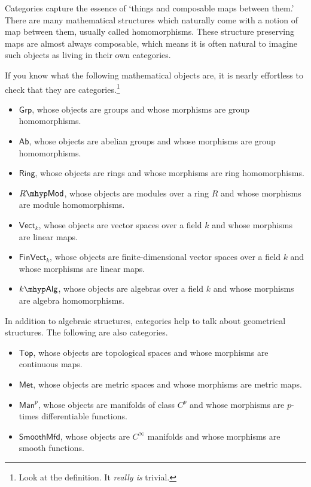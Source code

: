 \documentclass[notes.tex]{subfiles}
\begin{document}
Categories capture the essence of `things and composable maps between them.' There are many mathematical structures which naturally come with a notion of map between them, usually called homomorphisms. These structure preserving maps are almost always composable, which means it is often natural to imagine such objects as living in their own categories.
\begin{example}
  \label{eg:examplesofcategories}
  If you know what the following mathematical objects are, it is nearly effortless to check that they are categories.\footnote{Look at the definition. It \emph{really is} trivial.}
  \begin{itemize}
    \item $\mathsf{Grp}$, whose objects are groups and whose morphisms are group homomorphisms.

    \item\label{item:categoryab} $\mathsf{Ab}$, whose objects are abelian groups and whose morphisms are group homomorphisms.

    \item $\mathsf{Ring}$, whose objects are rings and whose morphisms are ring homomorphisms.

    \item $R\mhyp\mathsf{Mod}$, whose objects are modules over a ring $R$ and whose morphisms are module homomorphisms.

    \item $\mathsf{Vect}_{k}$, whose objects are vector spaces over a field $k$ and whose morphisms are linear maps.
    \item $\mathsf{FinVect}_{k}$, whose objects are finite-dimensional vector spaces over a field $k$ and whose morphisms are linear maps.
    \item $k\mhyp\mathsf{Alg}$, whose objects are algebras over a field $k$ and whose morphisms are algebra homomorphisms.
  \end{itemize}
\end{example}

\begin{example}
  \label{eg:moreexamplesofcategories}
  In addition to algebraic structures, categories help to talk about geometrical structures. The following are also categories.
  \begin{itemize}
    \item $\mathsf{Top}$, whose objects are topological spaces and whose morphisms are continuous maps.
    \item $\mathsf{Met}$, whose objects are metric spaces and whose morphisms are metric maps.
    \item $\mathsf{Man}^{p}$, whose objects are manifolds of class $C^{p}$ and whose morphisms are $p$-times differentiable functions.

    \item $\mathsf{SmoothMfd}$, whose objects are $C^{\infty}$ manifolds and whose morphisms are smooth functions.
  \end{itemize}
\end{example}
\end{document}
